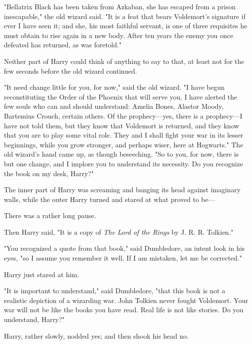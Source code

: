 "Bellatrix Black has been taken from Azkaban, she has escaped from a prison
inescapable," the old wizard said. "It is a feat that bears Voldemort's
signature if ever I have seen it; and she, his most faithful servant, is one of
three requisites he must obtain to rise again in a new body. After ten years
the enemy you once defeated has returned, as was foretold."

Neither part of Harry could think of anything to say to that, at least not for
the few seconds before the old wizard continued.

"It need change little for you, for now," said the old wizard. "I have begun
reconstituting the Order of the Phoenix that will serve you, I have alerted the
few souls who can and should understand: Amelia Bones, Alastor Moody, Bartemius
Crouch, certain others. Of the prophecy---yes, there is a prophecy---I have not
told them, but they know that Voldemort is returned, and they know that you are
to play some vital role. They and I shall fight your war in its lesser
beginnings, while you grow stronger, and perhaps wiser, here at Hogwarts." The
old wizard's hand came up, as though beseeching. "So to you, for now, there is
but one change, and I implore you to understand its necessity. Do you recognize
the book on my desk, Harry?"

The inner part of Harry was screaming and banging its head against imaginary
walls, while the outer Harry turned and stared at what proved to be---

There was a rather long pause.

Then Harry said, "It is a copy of \emph{The Lord of the Rings} by J. R. R.
Tolkien."

"You recognized a quote from that book," said Dumbledore, an intent look in his
eyes, "so I assume you remember it well. If I am mistaken, let me be corrected."

Harry just stared at him.

"It is important to understand," said Dumbledore, "that this book is not a
realistic depiction of a wizarding war. John Tolkien never fought Voldemort.
Your war will not be like the books you have read. Real life is not like
stories. Do you understand, Harry?"

Harry, rather slowly, nodded yes; and then shook his head no.

